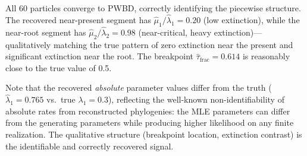 \documentclass[11pt,a4paper]{article}
\begin{document}
\smallskip
All 60 particles converge to PWBD, correctly identifying the piecewise structure.
The recovered near-present segment has $\hat\mu_1/\hat\lambda_1 = 0.20$
(low extinction), while the near-root segment has $\hat\mu_2/\hat\lambda_2 = 0.98$
(near-critical, heavy extinction)---qualitatively matching the true pattern of
zero extinction near the present and significant extinction near the root.
The breakpoint $\hat\tau_{\mathrm{frac}} = 0.614$ is reasonably close to the true value of 0.5.

Note that the recovered \emph{absolute} parameter values differ from the truth
($\hat\lambda_1 = 0.765$ vs.\ true $\lambda_1 = 0.3$),
reflecting the well-known non-identifiability of absolute rates from reconstructed phylogenies:
the MLE parameters can differ from the generating parameters while producing higher likelihood on any finite realization.
The qualitative structure (breakpoint location, extinction contrast) is the identifiable and correctly recovered signal.
\end{document}
